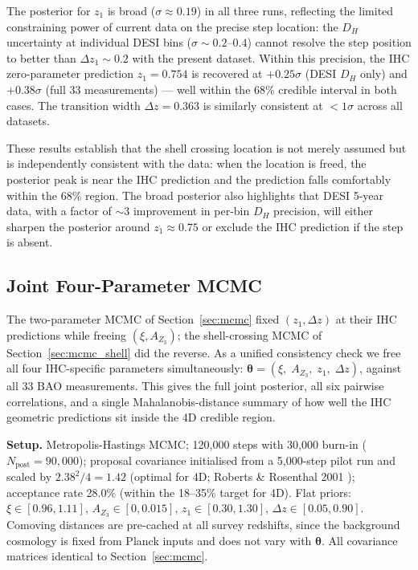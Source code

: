 \documentclass[12pt,a4paper]{article}
\begin{document}
The posterior for $z_1$ is broad ($\sigma \approx 0.19$) in all three runs,
reflecting the limited constraining power of current data on the precise step
location: the $D_H$ uncertainty at individual DESI bins ($\sigma \sim 0.2$--$0.4$)
cannot resolve the step position to better than $\Delta z_1 \sim 0.2$ with the
present dataset.  Within this precision, the IHC zero-parameter prediction
$z_1 = 0.754$ is recovered at $+0.25\sigma$ (DESI $D_H$ only) and
$+0.38\sigma$ (full 33 measurements) --- well within the 68\% credible interval
in both cases.  The transition width $\Delta z = 0.363$ is similarly consistent
at $< 1\sigma$ across all datasets.

These results establish that the shell crossing location is not merely assumed
but is independently consistent with the data: when the location is freed, the
posterior peak is near the IHC prediction and the prediction falls comfortably
within the 68\% region.  The broad posterior also highlights that DESI 5-year
data, with a factor of $\sim$3 improvement in per-bin $D_H$ precision, will
either sharpen the posterior around $z_1 \approx 0.75$ or exclude the IHC
prediction if the step is absent.

\subsection{Joint Four-Parameter MCMC}
\label{sec:mcmc_joint4}

The two-parameter MCMC of Section~\ref{sec:mcmc} fixed $(z_1, \Delta z)$ at their
IHC predictions while freeing $(\xi, A_{Z_3})$; the shell-crossing MCMC of
Section~\ref{sec:mcmc_shell} did the reverse.  As a unified consistency check we
free all four IHC-specific parameters simultaneously:
$\boldsymbol{\theta} = (\xi,\; A_{Z_3},\; z_1,\; \Delta z)$,
against all 33 BAO measurements.  This gives the full joint posterior, all six
pairwise correlations, and a single Mahalanobis-distance summary of how well the
IHC geometric predictions sit inside the 4D credible region.

\textbf{Setup.}  Metropolis-Hastings MCMC; 120,000 steps with 30,000 burn-in
($N_\mathrm{post} = 90{,}000$); proposal covariance initialised from a 5,000-step
pilot run and scaled by $2.38^2/4 = 1.42$ (optimal for 4D;
Roberts \& Rosenthal 2001 \citep{RobertsRosenthal2001}); acceptance rate 28.0\% (within the 18--35\% target
for 4D).  Flat priors:
$\xi \in [0.96, 1.11]$,
$A_{Z_3} \in [0, 0.015]$,
$z_1 \in [0.30, 1.30]$,
$\Delta z \in [0.05, 0.90]$.
Comoving distances are pre-cached at all survey redshifts, since the background
cosmology is fixed from Planck inputs and does not vary with $\boldsymbol{\theta}$.
All covariance matrices identical to Section~\ref{sec:mcmc}.
\end{document}
